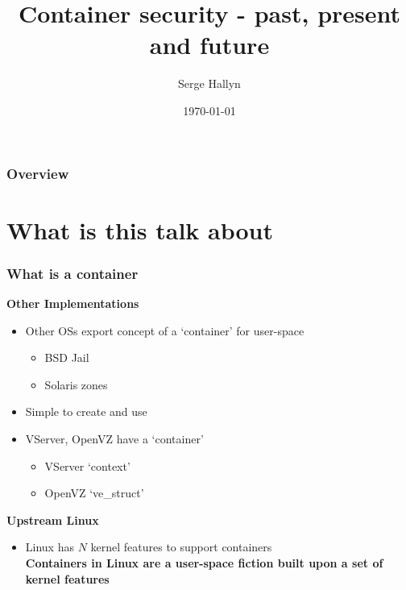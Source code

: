 \documentclass{beamer}
\title[Container Security]{Container security - past, present and future} %
\author{Serge Hallyn} %
\institute[Canonical] %
{
Canonical, Inc \\ %
\medskip
\textit{serge.hallyn@ubuntu.com} %
}
\date{\today} %
\begin{document}
\begin{frame}
\titlepage %
\end{frame}

\begin{frame}
\frametitle{Overview} %
\tableofcontents %
\end{frame}


\section{What is this talk about} %
\begin{frame}
\frametitle{What is a container}
  \pause
\textbf{Other Implementations}
\begin{itemize}
  \item Other OSs export concept of a `container' for user-space
    \begin{itemize}
      \item BSD Jail
      \item Solaris zones
    \end{itemize}
  \item Simple to create and use

  \pause
  \item VServer, OpenVZ have a `container'
    \begin{itemize}
      \item VServer `context'
      \item OpenVZ `ve\_struct'
    \end{itemize}
\end{itemize}

  \vspace{0.15in}
\textbf{Upstream Linux}
\begin{itemize}
  \item Linux has $N$ kernel features to support containers \\
  \vspace{0.15in}
  \pause
  {\bf Containers in Linux are a user-space fiction built upon a set of kernel features}
\end{itemize}

\end{frame}
\end{document}
